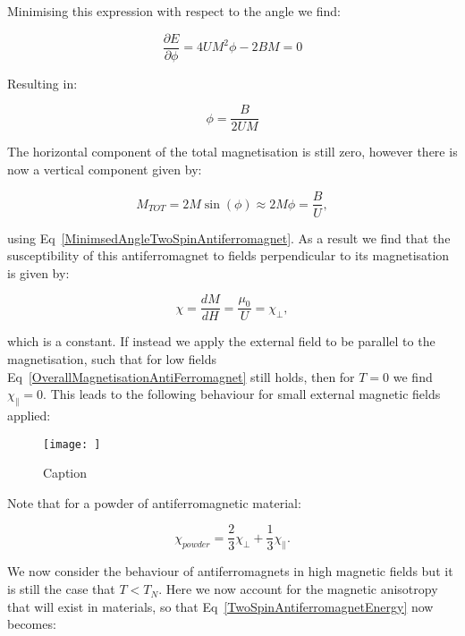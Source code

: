 \noindent Minimising this expression with respect to the angle we find:

\begin{equation}
    \frac{\partial E}{\partial \phi} = 4UM^2\phi - 2BM = 0
    \label{MinimsedTwoSpinAntiferromagnetEnergy}
\end{equation}

\noindent Resulting in:

\begin{equation}
    \phi  = \frac{B}{2UM}
    \label{MinimsedAngleTwoSpinAntiferromagnet}
\end{equation}

\noindent The horizontal component of the total magnetisation is still zero, however there is now a vertical component given by:

\begin{equation}
    M_{TOT} = 2M\sin(\phi) \approx 2M\phi = \frac{B}{U},
    \label{TotalVerticalMagnetisationTwoSpinAntiferromagnet}
\end{equation}

\noindent using Eq~\ref{MinimsedAngleTwoSpinAntiferromagnet}. As a result we find that the susceptibility of this antiferromagnet to fields perpendicular to its magnetisation is given by:

\begin{equation}
    \chi = \frac{dM}{dH} = \frac{\mu_0}{U} = \chi_\perp,
    \label{LowFieldPerpendicularSusceptibility}
\end{equation}

\noindent which is a constant. If instead we apply the external field to be parallel to the magnetisation, such that for low fields Eq~\ref{OverallMagnetisationAntiFerromagnet} still holds, then for $T = 0$ we find $\chi_\parallel = 0$. This leads to the following behaviour for small external magnetic fields applied:

\begin{figure}
    \centering
    \texttt{[image: ]}
    \caption{Caption}
    \label{fig:enter-label}
\end{figure}

\noindent Note that for a powder of antiferromagnetic material:

\begin{equation}
    \chi_{powder} = \frac{2}{3} \chi_\perp + \frac{1}{3} \chi_{\parallel}.
\end{equation}

\noindent We now consider the behaviour of antiferromagnets in high magnetic fields but it is still the case that $T < T_N$. Here we now account for the magnetic anisotropy that will exist in materials, so that Eq~\ref{TwoSpinAntiferromagnetEnergy} now becomes:

